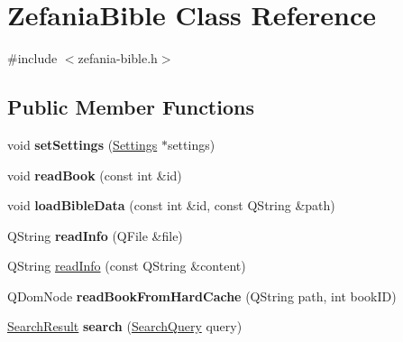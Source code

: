 \hypertarget{classZefaniaBible}{
\section{ZefaniaBible Class Reference}
\label{classZefaniaBible}
}


{\ttfamily \#include $<$zefania-\/bible.h$>$}

\subsection*{Public Member Functions}
\begin{DoxyCompactItemize}
\item 
\hypertarget{classZefaniaBible_a1903feb3c9d802fec5cabb90aaeeedf4}{
void {\bfseries setSettings} (\hyperlink{classSettings}{Settings} $\ast$settings)}
\label{classZefaniaBible_a1903feb3c9d802fec5cabb90aaeeedf4}

\item 
\hypertarget{classZefaniaBible_a35afefc88d8403c025125b8bf7e325f3}{
void {\bfseries readBook} (const int \&id)}
\label{classZefaniaBible_a35afefc88d8403c025125b8bf7e325f3}

\item 
\hypertarget{classZefaniaBible_aef886a2ed5d65079d2625cacfc68130c}{
void {\bfseries loadBibleData} (const int \&id, const QString \&path)}
\label{classZefaniaBible_aef886a2ed5d65079d2625cacfc68130c}

\item 
\hypertarget{classZefaniaBible_a530b3de742b09436a6698140c428a51a}{
QString {\bfseries readInfo} (QFile \&file)}
\label{classZefaniaBible_a530b3de742b09436a6698140c428a51a}

\item 
QString \hyperlink{classZefaniaBible_a2295f264abb8c603d6160d004327f9b9}{readInfo} (const QString \&content)
\item 
\hypertarget{classZefaniaBible_ad6aa8172ba4fc50114314c1f91a28204}{
QDomNode {\bfseries readBookFromHardCache} (QString path, int bookID)}
\label{classZefaniaBible_ad6aa8172ba4fc50114314c1f91a28204}

\item 
\hypertarget{classZefaniaBible_a31e7ab30e35e4c59e7a0e74acbb30951}{
\hyperlink{classSearchResult}{SearchResult} {\bfseries search} (\hyperlink{classSearchQuery}{SearchQuery} query)}
\label{classZefaniaBible_a31e7ab30e35e4c59e7a0e74acbb30951}


\end{DoxyCompactItemize}
